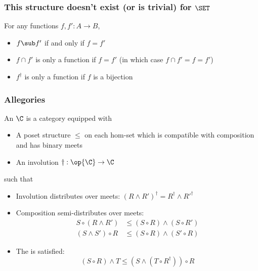 {    \begin{frame}
        \frametitle{This structure doesn't exist (or is trivial) for $\SET$}
        For any functions $f,f':A\to B$,
        \begin{itemize}\pause
            \item $f\sub f'$ if and only if $f=f'$\pause
            \item $f\cap f'$ is only a function if $f=f'$ (in which case $f\cap f'=f=f'$)\pause
            \item $f^\dagger$ is only a function if $f$ is a bijection 
        \end{itemize}
    \end{frame}

    \begin{frame}
        \frametitle{Allegories}\pause
        {\large
         An  $\C$ is a category equipped with\pause
        \begin{itemize}
            \item A poset structure $\leq$ on each hom-set \pause which is compatible with composition
                \pause\pause
                \pause and has binary meets
                \pause\pause
                \pause
            \item An involution $\dagger:\op{\C}\to\C$
        \end{itemize}\pause
        such that
        \begin{itemize}
            \item Involution distributes over meets: $(R\land R')^{\dagger} = R^{\dagger}\land R'^{\dagger}$\pause
            \item Composition semi-distributes over meets:
                \begin{align*}
                    S\circ (R\land R') &\leq (S\circ R)\land (S\circ R')\\
                    (S\land S')\circ R &\leq (S\circ R)\land (S'\circ R)
                \end{align*}\pause
            \item \vspace{-0.6cm}The  is satisfied:
                \[ (S\circ R)\land T \leq (S\land (T\circ R^{\dagger}))\circ R \]
        \end{itemize}
        }
    \end{frame}

}
